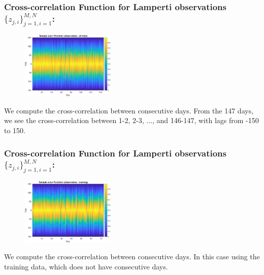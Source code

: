 \documentclass[aspectratio=169]{beamer}\usepackage[utf8]{inputenc}
\begin{document}
\begin{frame}\frametitle{Cross-correlation Function for Lamperti observations $\{z_{j,i}\}_{j=1,i=1}^{M,N}$:}

\begin{figure}[ht!]
\centering
\includegraphics[width=0.4\textwidth]{../../MATLAB_Files/Results/cross_correlation/obs_alldata_L.eps}
\end{figure}
We compute the cross-correlation between consecutive days. From the 147 days, we see the cross-correlation between 1-2, 2-3, $\dots$, and 146-147, with lags from -150 to 150.
\end{frame}


\begin{frame}\frametitle{Cross-correlation Function for Lamperti observations $\{z_{j,i}\}_{j=1,i=1}^{M,N}$:}

\begin{figure}[ht!]
\centering
\includegraphics[width=0.4\textwidth]{../../MATLAB_Files/Results/cross_correlation/obs_training_L.eps}
\end{figure}
We compute the cross-correlation between consecutive days. In this case using the training data, which does not have consecutive days.

\end{frame}

\end{document}

